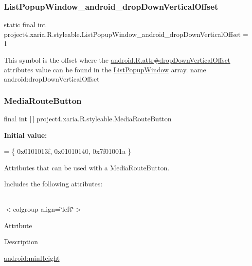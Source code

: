 \subsubsection{\texorpdfstring{List\+Popup\+Window\+\_\+android\+\_\+drop\+Down\+Vertical\+Offset}{ListPopupWindow\_android\_dropDownVerticalOffset}}
{\footnotesize\ttfamily static final int project4.\+xaria.\+R.\+styleable.\+List\+Popup\+Window\+\_\+android\+\_\+drop\+Down\+Vertical\+Offset = 1\hspace{0.3cm}{\ttfamily [static]}}

This symbol is the offset where the \hyperlink{}{android.\+R.\+attr\#drop\+Down\+Vertical\+Offset} attribute\textquotesingle{}s value can be found in the \hyperlink{classproject4_1_1xaria_1_1R_1_1styleable_a648f834c188005b618d26a2407391de2}{List\+Popup\+Window} array.  name android\+:drop\+Down\+Vertical\+Offset \mbox{\label{classproject4_1_1xaria_1_1R_1_1styleable_afbc7b05aea080f3e7e5fb4051290a14d}} 
\subsubsection{\texorpdfstring{Media\+Route\+Button}{MediaRouteButton}}
{\footnotesize\ttfamily final int \mbox{[}$\,$\mbox{]} project4.\+xaria.\+R.\+styleable.\+Media\+Route\+Button\hspace{0.3cm}{\ttfamily [static]}}

{\bfseries Initial value\+:}
\begin{DoxyCode}
= \{
            0x0101013f, 0x01010140, 0x7f01001a
        \}
\end{DoxyCode}
Attributes that can be used with a Media\+Route\+Button. 

Includes the following attributes\+:

\tabulinesep=1mm
\begin{longtabu} spread 0pt [c]{*{0}{|X[-1]}|}
\hline
\end{longtabu}
$<$colgroup align=\char`\"{}left\char`\"{}$>$ 

Attribute

Description 

{\ttfamily \hyperlink{classproject4_1_1xaria_1_1R_1_1styleable_a986fd72a47ce21b2c727eaba93fd24a9}{android\+:min\+Height}}

